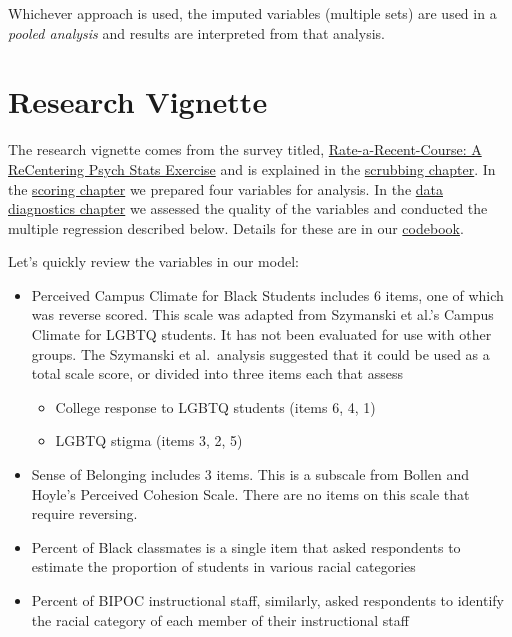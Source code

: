 \documentclass[
  11pt,
]{book}
\providecommand{\tightlist}{%
  \setlength{\itemsep}{0pt}\setlength{\parskip}{0pt}}
\begin{document}
Whichever approach is used, the imputed variables (multiple sets) are used in a \emph{pooled analysis} and results are interpreted from that analysis.

\hypertarget{research-vignette-3}{%
\section{Research Vignette}\label{research-vignette-3}}

The research vignette comes from the survey titled, \href{https://spupsych.az1.qualtrics.com/jfe/form/SV_b2cClqAlLGQ6nLU}{Rate-a-Recent-Course: A ReCentering Psych Stats Exercise} and is explained in the \protect\hyperlink{scrub}{scrubbing chapter}. In the \protect\hyperlink{score}{scoring chapter} we prepared four variables for analysis. In the \protect\hyperlink{DataDx}{data diagnostics chapter} we assessed the quality of the variables and conducted the multiple regression described below. Details for these are in our \href{./Rate-a-Course_Codebook.pdf}{codebook}.

Let's quickly review the variables in our model:

\begin{itemize}
\tightlist
\item
  Perceived Campus Climate for Black Students includes 6 items, one of which was reverse scored. This scale was adapted from Szymanski et al.'s \citeyearpar{szymanski_perceptions_2020} Campus Climate for LGBTQ students. It has not been evaluated for use with other groups. The Szymanski et al.~analysis suggested that it could be used as a total scale score, or divided into three items each that assess

  \begin{itemize}
  \tightlist
  \item
    College response to LGBTQ students (items 6, 4, 1)
  \item
    LGBTQ stigma (items 3, 2, 5)
  \end{itemize}
\item
  Sense of Belonging includes 3 items. This is a subscale from Bollen and Hoyle's \citeyearpar{bollen_perceived_1990} Perceived Cohesion Scale. There are no items on this scale that require reversing.
\item
  Percent of Black classmates is a single item that asked respondents to estimate the proportion of students in various racial categories
\item
  Percent of BIPOC instructional staff, similarly, asked respondents to identify the racial category of each member of their instructional staff
\end{itemize}
\end{document}
